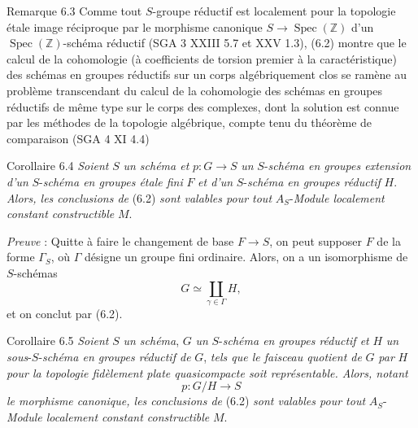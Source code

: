 \begin{statement}{Remarque 6.3}
Comme tout $S$-groupe réductif est localement pour la topologie étale image réciproque par le morphisme canonique $S\to\operatorname{Spec}(\mathbb{Z})$ d'un $\operatorname{Spec}(\mathbb{Z})$-schéma réductif (SGA 3 XXIII 5.7 et XXV 1.3), (6.2) montre que le calcul de la cohomologie (à coefficients de torsion premier à la caractéristique) des schémas en groupes réductifs sur un corps algébriquement clos se ramène au problème transcendant du calcul de la cohomologie des schémas en groupes réductifs de même type sur le corps des complexes, dont la solution est connue par les méthodes de la topologie algébrique, compte tenu du théorème de comparaison (SGA 4 XI 4.4)
\end{statement}

\begin{statement}{Corollaire 6.4}
\emph{Soient} $S$ \emph{un schéma et} $p:G\to S$ \emph{un} $S$-\emph{schéma en groupes extension d'un} $S$-\emph{schéma en groupes étale fini} $F$ \emph{et d'un} $S$-\emph{schéma en groupes réductif} $H$. \emph{Alors, les conclusions de} (6.2) \emph{sont valables pour tout} $A_S$-\emph{Module localement constant constructible} $M$.
\end{statement}

\emph{Preuve} : Quitte à faire le changement de base $F\to S$, on peut supposer $F$ de la forme $\Gamma_S$, où $\Gamma$ désigne un groupe fini ordinaire. Alors, on a un isomorphisme de $S$-schémas
\[
G\simeq\coprod_{\gamma\in\Gamma}H,
\]
et on conclut par (6.2).

\begin{statement}{Corollaire 6.5}
\emph{Soient} $S$ \emph{un schéma}, $G$ \emph{un} $S$-\emph{schéma en groupes réductif et} $H$ \emph{un sous}-$S$-\emph{schéma en groupes réductif de} $G$, \emph{tels que le faisceau quotient de} $G$ \emph{par} $H$ \emph{pour la topologie fidèlement plate quasicompacte soit représentable. Alors, notant}
\[
p:G/H\to S
\]
\emph{le morphisme canonique, les conclusions de} (6.2) \emph{sont valables pour tout} $A_S$-\emph{Module localement constant constructible} $M$.
\end{statement}

